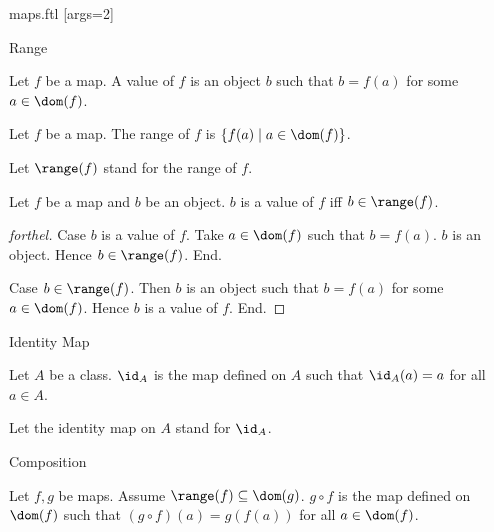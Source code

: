 \documentclass{naproche-library}
\begin{document}
\begin{smodule}[title=Maps]{maps.ftl}
[args=2]{}

\begin{sfragment}{Range}
  \begin{definition}[forthel,id=FOUNDATIONS_06_4284980337311744]
    Let $f$ be a map.
    A value of $f$ is an object $b$ such that $b = f(a)$ for some $a \in \dom(f)$.
  \end{definition}

  \begin{definition}[forthel,id=FOUNDATIONS_06_1938831225913344]
    Let $f$ be a map.
    The range of $f$ is $\{ f(a) \mid a \in \dom(f) \}$.

    Let $\range(f)$ stand for the range of $f$.
  \end{definition}

  \begin{proposition}[forthel,id=FOUNDATIONS_06_6386349418479616]
    Let $f$ be a map and $b$ be an object.
    $b$ is a value of $f$ iff $b \in \range(f)$.
  \end{proposition}
  \begin{proof}[forthel]
    Case $b$ is a value of $f$.
      Take $a \in \dom(f)$ such that $b = f(a)$.
      $b$ is an object.
      Hence $b \in \range(f)$.
    End.

    Case $b \in \range(f)$.
      Then $b$ is an object such that $b = f(a)$ for some $a \in \dom(f)$.
      Hence $b$ is a value of $f$.
    End.
  \end{proof}
\end{sfragment}

\begin{sfragment}{Identity Map}
  \begin{definition}[forthel,id=FOUNDATIONS_06_1920902360989696]
    Let $A$ be a class.
    $\id_{A}$ is the map defined on $A$ such that $\id_{A}(a) = a$ for all $a \in A$.

    Let the identity map on $A$ stand for $\id_{A}$.
  \end{definition}
\end{sfragment}

\begin{sfragment}{Composition}
  \begin{definition}[forthel,id=FOUNDATIONS_06_7605717729017856]
    Let $f, g$ be maps.
    Assume $\range(f) \subseteq \dom(g)$.
    $g \circ f$ is the map defined on $\dom(f)$ such that $(g \circ f)(a) = g(f(a))$ for all $a \in \dom(f)$.


\end{definition}
\end{sfragment}
\end{smodule}
\end{document}
